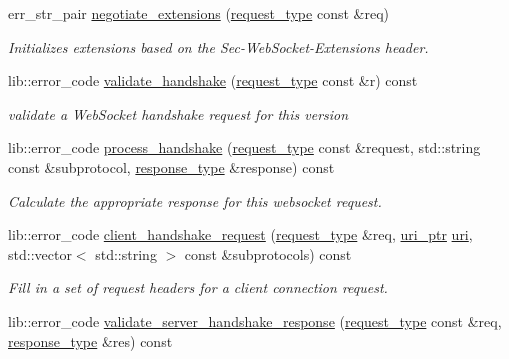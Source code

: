 \begin{DoxyCompactItemize}
\item 
err\+\_\+str\+\_\+pair \hyperlink{classwebsocketpp_1_1processor_1_1hybi13_a3a8e38f9640fe3b39100101af98fceee}{negotiate\+\_\+extensions} (\hyperlink{classwebsocketpp_1_1http_1_1parser_1_1request}{request\+\_\+type} const \&req)
\begin{DoxyCompactList}\small\item\em Initializes extensions based on the Sec-\/\+Web\+Socket-\/\+Extensions header. \end{DoxyCompactList}\item 
lib\+::error\+\_\+code \hyperlink{classwebsocketpp_1_1processor_1_1hybi13_af17a224a602ebcda5e481d8c249cf37c}{validate\+\_\+handshake} (\hyperlink{classwebsocketpp_1_1http_1_1parser_1_1request}{request\+\_\+type} const \&r) const
\begin{DoxyCompactList}\small\item\em validate a Web\+Socket handshake request for this version \end{DoxyCompactList}\item 
lib\+::error\+\_\+code \hyperlink{classwebsocketpp_1_1processor_1_1hybi13_aa527ee3ece912ef818a207fce5261383}{process\+\_\+handshake} (\hyperlink{classwebsocketpp_1_1http_1_1parser_1_1request}{request\+\_\+type} const \&request, std\+::string const \&subprotocol, \hyperlink{classwebsocketpp_1_1http_1_1parser_1_1response}{response\+\_\+type} \&response) const
\begin{DoxyCompactList}\small\item\em Calculate the appropriate response for this websocket request. \end{DoxyCompactList}\item 
lib\+::error\+\_\+code \hyperlink{classwebsocketpp_1_1processor_1_1hybi13_a587360571f5bb11b7d0c39b69566bf38}{client\+\_\+handshake\+\_\+request} (\hyperlink{classwebsocketpp_1_1http_1_1parser_1_1request}{request\+\_\+type} \&req, \hyperlink{namespacewebsocketpp_aae370ea5ac83a8ece7712cb39fc23f5b}{uri\+\_\+ptr} \hyperlink{classwebsocketpp_1_1uri}{uri}, std\+::vector$<$ std\+::string $>$ const \&subprotocols) const
\begin{DoxyCompactList}\small\item\em Fill in a set of request headers for a client connection request. \end{DoxyCompactList}\item 
lib\+::error\+\_\+code \hyperlink{classwebsocketpp_1_1processor_1_1hybi13_a8b3cea2f1526b4982e0836c5705584a8}{validate\+\_\+server\+\_\+handshake\+\_\+response} (\hyperlink{classwebsocketpp_1_1http_1_1parser_1_1request}{request\+\_\+type} const \&req, \hyperlink{classwebsocketpp_1_1http_1_1parser_1_1response}{response\+\_\+type} \&res) const

\end{DoxyCompactItemize}
